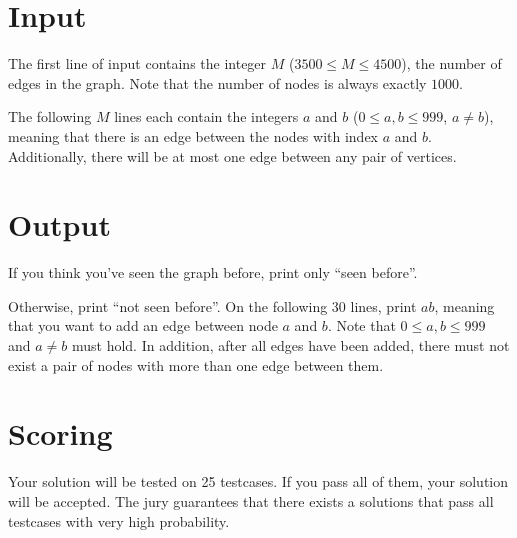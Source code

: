 \section*{Input}
The first line of input contains the integer $M$ ($3500 \leq M \leq 4500$), the number of edges in the graph. Note that
the number of nodes is always exactly $1000$.

The following $M$ lines each contain the integers $a$ and $b$ ($0 \leq a,b \leq 999$, $a \neq b$), meaning that there is an edge
between the nodes with index $a$ and $b$. Additionally, there will be at most one edge between any pair of vertices.

\section*{Output}
If you think you've seen the graph before, print only ``seen before''.

Otherwise, print ``not seen before''. On the following $30$ lines, print $a b$, meaning that you want to add
an edge between node $a$ and $b$. Note that $0 \leq a,b \leq 999$ and $a \neq b$ must hold. In addition, after
all edges have been added, there must not exist a pair of nodes with more than one edge between them.

\section*{Scoring}
Your solution will be tested on 25 testcases. If you pass all of them, your solution will be accepted.
The jury guarantees that there exists a solutions that pass all testcases with very high probability.

